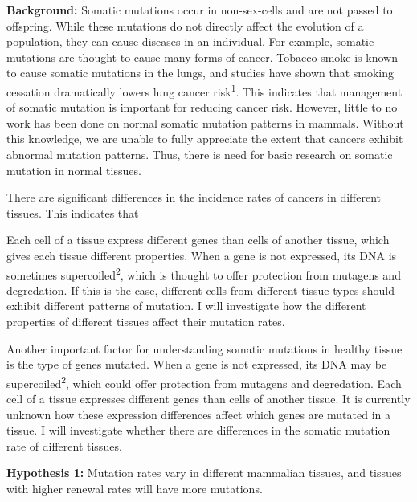 \documentclass[12pt]{article}
\begin{document}
\noindent
\textbf{Background:}
Somatic mutations occur in non-sex-cells and are not passed to offspring. While these mutations do not directly affect the evolution of a population, they can cause diseases in an individual. For example, somatic mutations are thought to cause many forms of cancer. Tobacco smoke is known to cause somatic mutations in the lungs, and studies have shown that smoking cessation dramatically lowers lung cancer risk\textsuperscript{1}. This indicates that management of somatic mutation is important for reducing cancer risk. However, little to no work has been done on normal somatic mutation patterns in mammals. Without this knowledge, we are unable to fully appreciate the extent that cancers exhibit abnormal mutation patterns. Thus, there is need for basic research on somatic mutation in normal tissues.


There are significant differences in the incidence rates of cancers in different tissues. This indicates that 

Each cell of a tissue express different genes than cells of another tissue, which gives each tissue different properties. When a gene is not expressed, its DNA is sometimes supercoiled\textsuperscript{2}, which is thought to offer protection from mutagens and degredation. If this is the case, different cells from different tissue types should exhibit different patterns of mutation. I will investigate how the different properties of different tissues affect their mutation rates. 


Another important factor for understanding somatic mutations in healthy tissue is the type of genes mutated. When a gene is not expressed, its DNA may be supercoiled\textsuperscript{2}, which could offer protection from mutagens and degredation. Each cell of a tissue expresses different genes than cells of another tissue. It is currently unknown how these expression differences affect which genes are mutated in a tissue. I will investigate whether there are differences in the somatic mutation rate of different tissues. 

\textbf{Hypothesis 1:}
Mutation rates vary in different mammalian tissues, and tissues with higher %
renewal rates will have more mutations.
\end{document}
